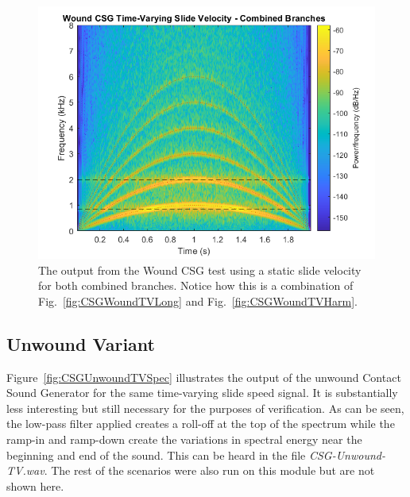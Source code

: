 \documentclass[../main.tex]{subfiles}
\begin{document}
\begin{figure}[b]
    \centering
    \includegraphics[scale=.60]{./images/plots/CSG_Wound_TV_Both.png}
    \caption{The output from the Wound CSG test using a static slide velocity for both combined branches. Notice how this is a combination of Fig.~\ref{fig:CSGWoundTVLong} and Fig.~\ref{fig:CSGWoundTVHarm}.}
    \label{fig:CSGWoundTVBoth}
\end{figure}

\clearpage

\subsection{Unwound Variant}
Figure~\ref{fig:CSGUnwoundTVSpec} illustrates the output of the unwound Contact Sound Generator for the same time-varying slide speed signal. It is substantially less interesting but still necessary for the purposes of verification. As can be seen, the low-pass filter applied creates a roll-off at the top of the spectrum while the ramp-in and ramp-down create the variations in spectral energy near the beginning and end of the sound. This can be heard in the file \emph{CSG-Unwound-TV.wav}. The rest of the scenarios were also run on this module but are not shown here.
\end{document}
